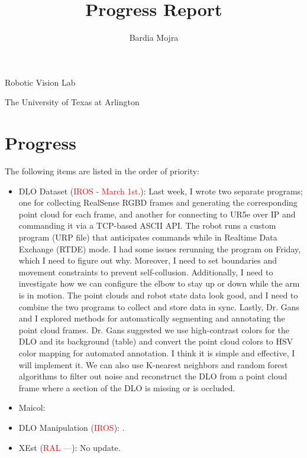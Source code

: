 \documentclass[11pt]{article}
\title{Progress Report}
\author{Bardia Mojra}
\begin{document}
\maketitle
\thispagestyle{empty}

\bigskip
\bigskip
\begin{center}
 Robotic Vision Lab
\end{center}

\begin{center}
The University of Texas at Arlington
\end{center}

\newpage



\section{Progress}
The following items are listed in the order of priority:
\begin{itemize}
  \item DLO Dataset (\textcolor{red}{IROS - March 1st.}): Last week, I wrote two
  separate programs; one for collecting RealSense RGBD frames and generating the
  corresponding point cloud for each frame, and another for connecting to UR5e
  over IP and commanding it via a TCP-based ASCII API. The robot runs a custom
  program (URP file) that anticipates commands while in Realtime Data Exchange
  (RTDE) mode. I had some issues rerunning the program on Friday, which I need to
  figure out why. Moreover, I need to set boundaries and movement constraints
  to prevent self-collusion. Additionally, I need to investigate how we can
  configure the elbow to stay up or down while the arm is in motion. The point
  clouds and robot state data look good, and I need to combine the two programs
  to collect and store data in sync. Lastly, Dr. Gans and I explored methods for
  automatically segmenting and annotating the point cloud frames. Dr. Gans
  suggested we use high-contrast colors for the DLO and its background (table)
  and convert the point cloud colors to HSV color mapping for automated annotation.
  I think it is simple and effective, I will implement it. We can also use
  K-nearest neighbors and random forest algorithms to filter out noise and reconstruct
  the DLO from a point cloud frame where a section of the DLO is missing or
  is occluded.\\
  \item Maicol:
  \item DLO Manipulation (\textcolor{red}{IROS}): \cite{abraham2017model}.\\
  \item XEst (\textcolor{red}{RAL ---}): No update.\\
  \end{itemize}
\end{document}
